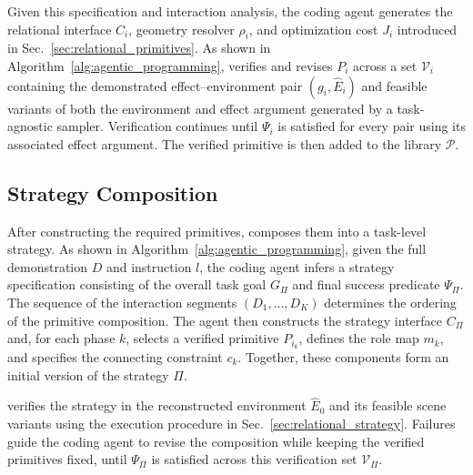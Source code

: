 Given this specification and interaction analysis, the coding agent generates the relational interface $C_i$, geometry resolver $\rho_i$, and optimization cost $J_i$ introduced in Sec.~\ref{sec:relational_primitives}. As shown in Algorithm~\ref{alg:agentic_programming}, \ours verifies and revises $P_i$ across a set $\mathcal{V}_i$ containing the demonstrated effect--environment pair $(g_i,\widehat{E}_i)$ and feasible variants of both the environment and effect argument generated by a task-agnostic sampler. Verification continues until $\Psi_i$ is satisfied for every pair using its associated effect argument. The verified primitive is then added to the library $\mathcal{P}$.

\subsection{Strategy Composition}
\label{sec:program_revision}

After constructing the required primitives, \ours composes them into a task-level strategy. As shown in Algorithm~\ref{alg:agentic_programming}, given the full demonstration $D$ and instruction $l$, the coding agent infers a strategy specification consisting of the overall task goal $G_\Pi$ and final success predicate $\Psi_\Pi$. The sequence of the interaction segments $(D_1,\ldots,D_K)$ determines the ordering of the primitive composition. The agent then constructs the strategy interface $C_\Pi$ and, for each phase $k$, selects a verified primitive $P_{i_k}$, defines the role map $m_k$, and specifies the connecting constraint $c_k$. Together, these components form an initial version of the strategy $\Pi$. 

\ours verifies the strategy in the reconstructed environment $\widehat{E}_0$ and its feasible scene variants using the execution procedure in Sec.~\ref{sec:relational_strategy}. Failures guide the coding agent to revise the composition while keeping the verified primitives fixed, until $\Psi_\Pi$ is satisfied across this verification set $\mathcal{V}_\Pi$.

